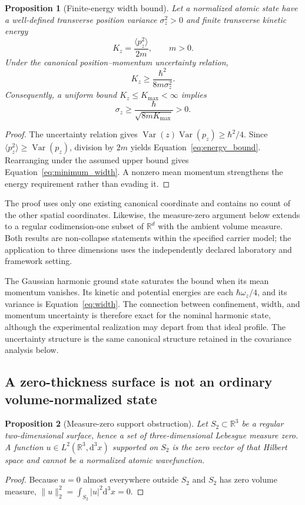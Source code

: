 \documentclass[11pt,a4paper]{article}
\newtheorem{proposition}{Proposition}[section]
\theoremstyle{definition}
\theoremstyle{remark}
\newcommand{\dd}{\mathrm{d}}
\newcommand{\Var}{\operatorname{Var}}
\newcommand{\R}{\mathbb{R}}
\begin{document}
\begin{proposition}[Finite-energy width bound]
Let a normalized atomic state have a well-defined transverse position variance $\sigma_z^2>0$ and finite transverse kinetic energy
\begin{equation}
 K_z=\frac{\langle p_z^2\rangle}{2m},\qquad m>0.
 \label{eq:kinetic}
\end{equation}
Under the canonical position--momentum uncertainty relation,
\begin{equation}
 K_z\geq\frac{\hbar^2}{8m\sigma_z^2}.
 \label{eq:energy_bound}
\end{equation}
Consequently, a uniform bound $K_z\leq K_{\max}<\infty$ implies
\begin{equation}
 \sigma_z\geq\frac{\hbar}{\sqrt{8mK_{\max}}}>0.
 \label{eq:minimum_width}
\end{equation}
\end{proposition}
\begin{proof}
The uncertainty relation gives $\Var(z)\Var(p_z)\geq\hbar^2/4$. Since $\langle p_z^2\rangle\geq\Var(p_z)$, division by $2m$ yields Equation~\eqref{eq:energy_bound}. Rearranging under the assumed upper bound gives Equation~\eqref{eq:minimum_width}. A nonzero mean momentum strengthens the energy requirement rather than evading it.
\end{proof}

The proof uses only one existing canonical coordinate and contains no count of the other spatial coordinates. Likewise, the measure-zero argument below extends to a regular codimension-one subset of $\R^d$ with the ambient volume measure. Both results are non-collapse statements within the specified carrier model; the application to three dimensions uses the independently declared laboratory and framework setting.

The Gaussian harmonic ground state saturates the bound when its mean momentum vanishes. Its kinetic and potential energies are each $\hbar\omega_z/4$, and its variance is Equation~\eqref{eq:width}. The connection between confinement, width, and momentum uncertainty is therefore exact for the nominal harmonic state, although the experimental realization may depart from that ideal profile. The uncertainty structure is the same canonical structure retained in the covariance analysis below.\cite{hadzibabic,weedbrook}

\subsection{A zero-thickness surface is not an ordinary volume-normalized state}
\begin{proposition}[Measure-zero support obstruction]
Let $S_2\subset\R^3$ be a regular two-dimensional surface, hence a set of three-dimensional Lebesgue measure zero. A function $u\in L^2(\R^3,\dd^3x)$ supported on $S_2$ is the zero vector of that Hilbert space and cannot be a normalized atomic wavefunction.
\end{proposition}
\begin{proof}
Because $u=0$ almost everywhere outside $S_2$ and $S_2$ has zero volume measure,
$\|u\|_2^2=\int_{S_2}|u|^2\dd^3x=0$.
\end{proof}
\end{document}
